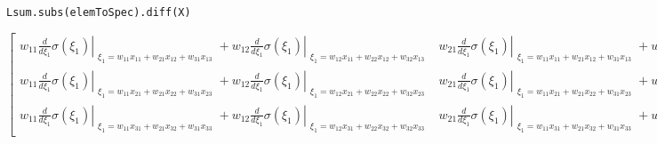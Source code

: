 \documentclass[
]{article}
\begin{document}
\begin{verbatim}
Lsum.subs(elemToSpec).diff(X)
\end{verbatim}

\(\displaystyle \left[\begin{matrix}w_{11} \left. \frac{d}{d \xi_{1}} \sigma{\left(\xi_{1} \right)} \right|_{\substack{ \xi_{1}=w_{11} x_{11} + w_{21} x_{12} + w_{31} x_{13} }} + w_{12} \left. \frac{d}{d \xi_{1}} \sigma{\left(\xi_{1} \right)} \right|_{\substack{ \xi_{1}=w_{12} x_{11} + w_{22} x_{12} + w_{32} x_{13} }} & w_{21} \left. \frac{d}{d \xi_{1}} \sigma{\left(\xi_{1} \right)} \right|_{\substack{ \xi_{1}=w_{11} x_{11} + w_{21} x_{12} + w_{31} x_{13} }} + w_{22} \left. \frac{d}{d \xi_{1}} \sigma{\left(\xi_{1} \right)} \right|_{\substack{ \xi_{1}=w_{12} x_{11} + w_{22} x_{12} + w_{32} x_{13} }} & w_{31} \left. \frac{d}{d \xi_{1}} \sigma{\left(\xi_{1} \right)} \right|_{\substack{ \xi_{1}=w_{11} x_{11} + w_{21} x_{12} + w_{31} x_{13} }} + w_{32} \left. \frac{d}{d \xi_{1}} \sigma{\left(\xi_{1} \right)} \right|_{\substack{ \xi_{1}=w_{12} x_{11} + w_{22} x_{12} + w_{32} x_{13} }}\\w_{11} \left. \frac{d}{d \xi_{1}} \sigma{\left(\xi_{1} \right)} \right|_{\substack{ \xi_{1}=w_{11} x_{21} + w_{21} x_{22} + w_{31} x_{23} }} + w_{12} \left. \frac{d}{d \xi_{1}} \sigma{\left(\xi_{1} \right)} \right|_{\substack{ \xi_{1}=w_{12} x_{21} + w_{22} x_{22} + w_{32} x_{23} }} & w_{21} \left. \frac{d}{d \xi_{1}} \sigma{\left(\xi_{1} \right)} \right|_{\substack{ \xi_{1}=w_{11} x_{21} + w_{21} x_{22} + w_{31} x_{23} }} + w_{22} \left. \frac{d}{d \xi_{1}} \sigma{\left(\xi_{1} \right)} \right|_{\substack{ \xi_{1}=w_{12} x_{21} + w_{22} x_{22} + w_{32} x_{23} }} & w_{31} \left. \frac{d}{d \xi_{1}} \sigma{\left(\xi_{1} \right)} \right|_{\substack{ \xi_{1}=w_{11} x_{21} + w_{21} x_{22} + w_{31} x_{23} }} + w_{32} \left. \frac{d}{d \xi_{1}} \sigma{\left(\xi_{1} \right)} \right|_{\substack{ \xi_{1}=w_{12} x_{21} + w_{22} x_{22} + w_{32} x_{23} }}\\w_{11} \left. \frac{d}{d \xi_{1}} \sigma{\left(\xi_{1} \right)} \right|_{\substack{ \xi_{1}=w_{11} x_{31} + w_{21} x_{32} + w_{31} x_{33} }} + w_{12} \left. \frac{d}{d \xi_{1}} \sigma{\left(\xi_{1} \right)} \right|_{\substack{ \xi_{1}=w_{12} x_{31} + w_{22} x_{32} + w_{32} x_{33} }} & w_{21} \left. \frac{d}{d \xi_{1}} \sigma{\left(\xi_{1} \right)} \right|_{\substack{ \xi_{1}=w_{11} x_{31} + w_{21} x_{32} + w_{31} x_{33} }} + w_{22} \left. \frac{d}{d \xi_{1}} \sigma{\left(\xi_{1} \right)} \right|_{\substack{ \xi_{1}=w_{12} x_{31} + w_{22} x_{32} + w_{32} x_{33} }} & w_{31} \left. \frac{d}{d \xi_{1}} \sigma{\left(\xi_{1} \right)} \right|_{\substack{ \xi_{1}=w_{11} x_{31} + w_{21} x_{32} + w_{31} x_{33} }} + w_{32} \left. \frac{d}{d \xi_{1}} \sigma{\left(\xi_{1} \right)} \right|_{\substack{ \xi_{1}=w_{12} x_{31} + w_{22} x_{32} + w_{32} x_{33} }}\end{matrix}\right]\)
\end{document}
